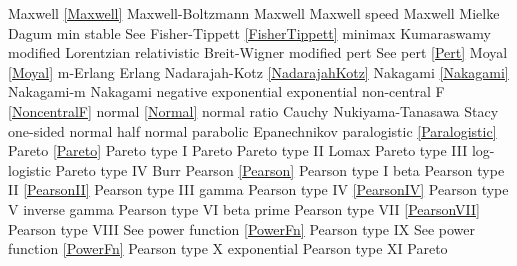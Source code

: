 Maxwell 						\dotfill	\eqref{Maxwell} 					\ncite	%
Maxwell-Boltzmann 				\dotfill	Maxwell 							\ncite 	%
Maxwell speed					\dotfill	Maxwell 							\ncite	%
Mielke						\dotfill	Dagum							\ncite	%
min stable						\dotfill	See Fisher-Tippett \eqref{FisherTippett}	\ncite
minimax 						\dotfill	Kumaraswamy 						 	%
modified Lorentzian				\dotfill	relativistic Breit-Wigner					%
modified pert					\dotfill	See pert \eqref{Pert}					\ncite	%
Moyal						\dotfill	\eqref{Moyal}						\ncite	
m-Erlang						\dotfill	Erlang 							\ncite	%
%
Nadarajah-Kotz					\dotfill	\eqref{NadarajahKotz}				\mcite{\self}	%
Nakagami 					\dotfill	\eqref{Nakagami} 					\ncite	%
Nakagami-m 					\dotfill	Nakagami 						\ncite   	%
negative exponential				\dotfill	exponential 						\ncite	%
non-central F					\dotfill		\eqref{NoncentralF}				\ncite	%
normal 						\dotfill	\eqref{Normal}						\ncite	%
normal ratio  					\dotfill	Cauchy 							\ncite	%
Nukiyama-Tanasawa 			\dotfill	Stacy 							   	%
%
one-sided normal  				\dotfill	half normal						\ncite	%
parabolic						\dotfill	Epanechnikov						\ncite
paralogistic					\dotfill	\eqref{Paralogistic} 					\ncite	%
Pareto							\dotfill	\eqref{Pareto}						\ncite	%
Pareto type I					\dotfill	Pareto							\ncite	%
Pareto type II					\dotfill	Lomax 							\ncite	%
Pareto type III					\dotfill	log-logistic						\ncite	%
Pareto type IV					\dotfill	Burr								\ncite	%
Pearson			 			\dotfill	\eqref{Pearson}						\ncite	%
Pearson type I					\dotfill	beta 								\ncite	%
Pearson type II					\dotfill	\eqref{PearsonII}					\ncite	%
Pearson type III   				\dotfill	gamma 							\ncite	%
Pearson type IV   				\dotfill	\eqref{PearsonIV} 					\ncite	%
Pearson type V    				\dotfill	inverse gamma						\ncite	%
Pearson type VI				\dotfill	beta prime 						\ncite	%
Pearson type VII				\dotfill	\eqref{PearsonVII} 					\ncite	%
Pearson type VIII				\dotfill	See power function \eqref{PowerFn}		\ncite	%
Pearson type IX				\dotfill	See power function \eqref{PowerFn}		\ncite	%
Pearson type X    				\dotfill	exponential						\ncite	%
Pearson type XI    				\dotfill	Pareto							   	%
